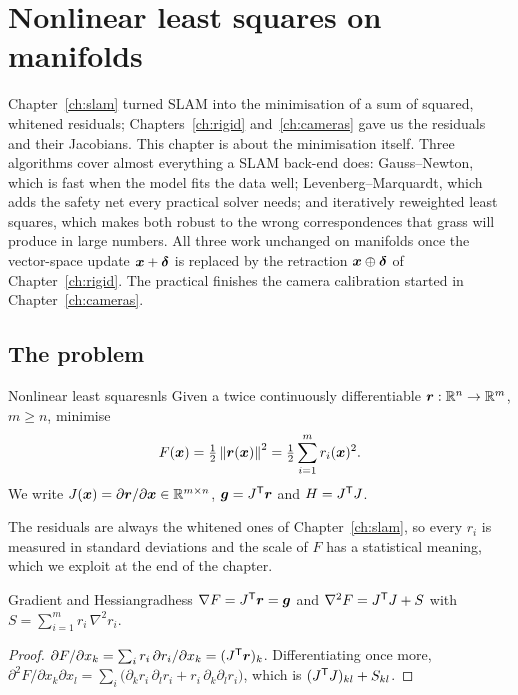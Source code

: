 \chapter{Nonlinear least squares on manifolds}
\label{ch:nls}

Chapter~\ref{ch:slam} turned SLAM into the minimisation of a sum of
squared, whitened residuals; Chapters~\ref{ch:rigid} and~\ref{ch:cameras}
gave us the residuals and their Jacobians. This chapter is about the
minimisation itself. Three algorithms cover almost everything a SLAM
back-end does: Gauss--Newton, which is fast when the model fits the data
well; Levenberg--Marquardt, which adds the safety net every practical
solver needs; and iteratively reweighted least squares, which makes both
robust to the wrong correspondences that grass will produce in large
numbers. All three work unchanged on manifolds once the vector-space
update $\bm{x}+\bm{\delta}$ is replaced by the retraction $\bm{x}\oplus
\bm{\delta}$ of Chapter~\ref{ch:rigid}. The practical finishes the camera
calibration started in Chapter~\ref{ch:cameras}.

\section{The problem}

\begin{definition}{Nonlinear least squares}{nls}
Given a twice continuously differentiable $\bm{r}:\mathbb{R}^n\to\mathbb{R}^m$,
$m\ge n$, minimise
\[
F(\bm{x})=\tfrac12\left\lVert \bm{r}(\bm{x})\right\rVert^2=\tfrac12\sum_{i=1}^m r_i(\bm{x})^2 .
\]
We write $J(\bm{x})=\partial\bm{r}/\partial\bm{x}\in\mathbb{R}^{m\times n}$,
$\bm{g}=J^{\mathsf{T}}\bm{r}$ and $H=J^{\mathsf{T}} J$.
\end{definition}

The residuals are always the whitened ones of Chapter~\ref{ch:slam}, so
every $r_i$ is measured in standard deviations and the scale of $F$ has
a statistical meaning, which we exploit at the end of the chapter.

\begin{proposition}{Gradient and Hessian}{gradhess}
$\nabla F=J^{\mathsf{T}}\bm{r}=\bm{g}$ and
$\nabla^2F=J^{\mathsf{T}} J+S$ with $S=\sum_{i=1}^m r_i\,\nabla^2r_i$.
\end{proposition}

\begin{proof}
$\partial F/\partial x_k=\sum_ir_i\,\partial r_i/\partial x_k=(J^{\mathsf{T}}
\bm{r})_k$. Differentiating once more,
$\partial^2F/\partial x_k\partial x_l=\sum_i\bigl(\partial_kr_i\,
\partial_lr_i+r_i\,\partial_k\partial_lr_i\bigr)$, which is
$(J^{\mathsf{T}} J)_{kl}+S_{kl}$.
\end{proof}

